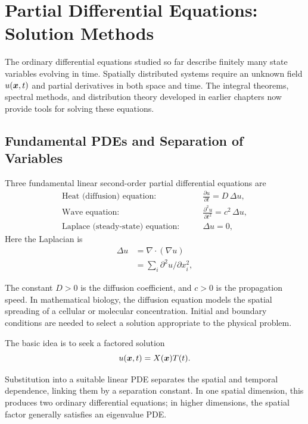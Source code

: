 \section{Partial Differential Equations: Solution Methods}
\label{sec:pde-methods}

The ordinary differential equations studied so far describe finitely many state variables evolving in time. Spatially distributed systems require an unknown field $u(\bm{x},t)$ and partial derivatives in both space and time. The integral theorems, spectral methods, and distribution theory developed in earlier chapters now provide tools for solving these equations.

\subsection{Fundamental PDEs and Separation of Variables}

Three fundamental linear second-order partial differential equations are
\begin{align}
\text{Heat (diffusion) equation:}\qquad &\frac{\partial u}{\partial t}=D\,\Delta u,\\
\text{Wave equation:}\qquad &\frac{\partial^2u}{\partial t^2}=c^2\,\Delta u,\\
\text{Laplace (steady-state) equation:}\qquad &\Delta u=0,
\end{align}
Here the Laplacian is
\[
\begin{aligned}
\Delta u &= \nabla\cdot(\nabla u) \\
&= \sum_i\partial^2u/\partial x_i^2,
\end{aligned}
\]

The constant $D>0$ is the diffusion coefficient, and $c>0$ is the propagation speed. In mathematical biology, the diffusion equation models the spatial spreading of a cellular or molecular concentration. Initial and boundary conditions are needed to select a solution appropriate to the physical problem.


The basic idea is to seek a factored solution
\[
u(\bm{x},t)=X(\bm{x})T(t).
\]

Substitution into a suitable linear PDE separates the spatial and temporal dependence, linking them by a separation constant. In one spatial dimension, this produces two ordinary differential equations; in higher dimensions, the spatial factor generally satisfies an eigenvalue PDE.

